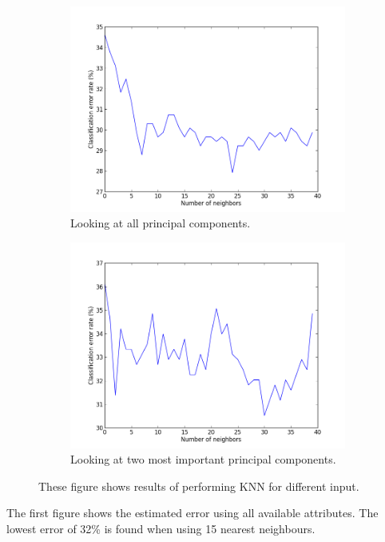 \begin{figure}[H]
	\begin{subfigure}[b]{0.5\textwidth}
	\includegraphics[scale=0.3]{pictures/knnPC.png}
	\caption{Looking at all principal components.}
	\label{knnResultXPA}
	\end{subfigure}
	\begin{subfigure}[b]{0.5\textwidth}
	\includegraphics[scale=0.3]{pictures/knn2PC.png}
	\caption{Looking at two most important principal components.}
	\label{knnResultX2PA}
	\end{subfigure}
\caption{These figure shows results of performing KNN for different input.}
\label{knnResults}
\end{figure}
The first figure shows the estimated error using all available attributes. The lowest error of 32\% is found when using 15 nearest neighbours.

